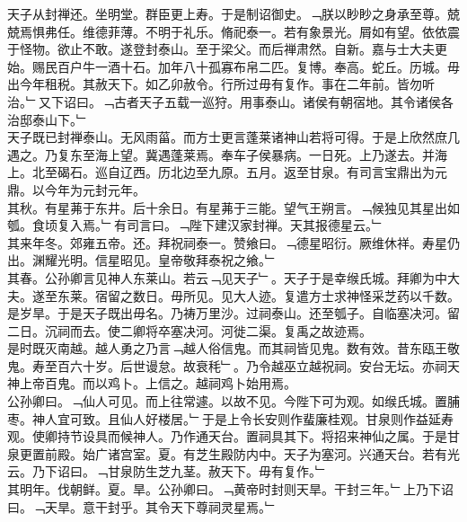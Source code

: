 \documentclass{zhvt-classic}
\begin{document}
\hspace*{2em}天子从封禅还。坐明堂。群臣更上寿。于是制诏御史。﹁朕以眇眇之身承至尊。兢兢焉惧弗任。维德菲薄。不明于礼乐。脩祀泰一。若有象景光。屑如有望。依依震于怪物。欲止不敢。遂登封泰山。至于梁父。而后禅肃然。自新。嘉与士大夫更始。赐民百户牛一酒十石。加年八十孤寡布帛二匹。复博。奉高。蛇丘。历城。毋出今年租税。其赦天下。如乙卯赦令。行所过毋有复作。事在二年前。皆勿听治。﹂又下诏曰。﹁古者天子五载一巡狩。用事泰山。诸侯有朝宿地。其令诸侯各治邸泰山下。﹂\\
\hspace*{2em}天子既已封禅泰山。无风雨菑。而方士更言蓬莱诸神山若将可得。于是上欣然庶几遇之。乃复东至海上望。冀遇蓬莱焉。奉车子侯暴病。一日死。上乃遂去。并海上。北至碣石。巡自辽西。历北边至九原。五月。返至甘泉。有司言宝鼎出为元鼎。以今年为元封元年。\\
\hspace*{2em}其秋。有星茀于东井。后十余日。有星茀于三能。望气王朔言。﹁候独见其星出如瓠。食顷复入焉。﹂有司言曰。﹁陛下建汉家封禅。天其报德星云。﹂\\
\hspace*{2em}其来年冬。郊雍五帝。还。拜祝祠泰一。赞飨曰。﹁德星昭衍。厥维休祥。寿星仍出。渊耀光明。信星昭见。皇帝敬拜泰祝之飨。﹂\\
\hspace*{2em}其春。公孙卿言见神人东莱山。若云﹁见天子﹂。天子于是幸缑氏城。拜卿为中大夫。遂至东莱。宿留之数日。毋所见。见大人迹。复遣方士求神怪采芝药以千数。是岁旱。于是天子既出毋名。乃祷万里沙。过祠泰山。还至瓠子。自临塞决河。留二日。沉祠而去。使二卿将卒塞决河。河徙二渠。复禹之故迹焉。\\
\hspace*{2em}是时既灭南越。越人勇之乃言﹁越人俗信鬼。而其祠皆见鬼。数有效。昔东瓯王敬鬼。寿至百六十岁。后世谩怠。故衰秏﹂。乃令越巫立越祝祠。安台无坛。亦祠天神上帝百鬼。而以鸡卜。上信之。越祠鸡卜始用焉。\\
\hspace*{2em}公孙卿曰。﹁仙人可见。而上往常遽。以故不见。今陛下可为观。如缑氏城。置脯枣。神人宜可致。且仙人好楼居。﹂于是上令长安则作蜚廉桂观。甘泉则作益延寿观。使卿持节设具而候神人。乃作通天台。置祠具其下。将招来神仙之属。于是甘泉更置前殿。始广诸宫室。夏。有芝生殿防内中。天子为塞河。兴通天台。若有光云。乃下诏曰。﹁甘泉防生芝九茎。赦天下。毋有复作。﹂\\
\hspace*{2em}其明年。伐朝鲜。夏。旱。公孙卿曰。﹁黄帝时封则天旱。干封三年。﹂上乃下诏曰。﹁天旱。意干封乎。其令天下尊祠灵星焉。﹂\\
\end{document}
